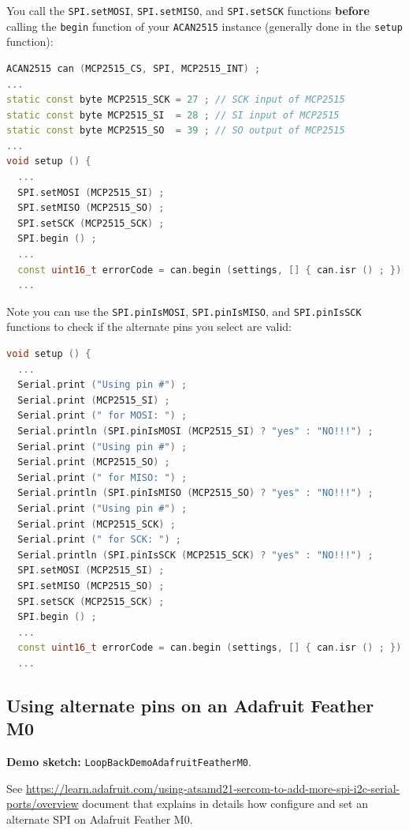 \documentclass[10pt, a4paper, obeyspaces]{extarticle}
\newcommand \subsectionLabel[2]{\subsection{#1}\label{subsec:#2}}
\begin{document}
You call the \texttt{SPI.setMOSI}, \texttt{SPI.setMISO}, and \texttt{SPI.setSCK} functions \textbf{before} calling the \texttt{begin} function of your \texttt{ACAN2515} instance (generally done in the \texttt{setup} function):
{ \small\begin{lstlisting}[language=c++]
ACAN2515 can (MCP2515_CS, SPI, MCP2515_INT) ;
...
static const byte MCP2515_SCK = 27 ; // SCK input of MCP2515 
static const byte MCP2515_SI  = 28 ; // SI input of MCP2515  
static const byte MCP2515_SO  = 39 ; // SO output of MCP2515 
...
void setup () {
  ...
  SPI.setMOSI (MCP2515_SI) ;
  SPI.setMISO (MCP2515_SO) ;
  SPI.setSCK (MCP2515_SCK) ;
  SPI.begin () ;
  ...
  const uint16_t errorCode = can.begin (settings, [] { can.isr () ; }) ;
  ...
\end{lstlisting}}

Note you can use the \texttt{SPI.pinIsMOSI}, \texttt{SPI.pinIsMISO}, and \texttt{SPI.pinIsSCK} functions to check if the alternate pins you select are valid:
{ \small\begin{lstlisting}[language=c++]
void setup () {
  ...
  Serial.print ("Using pin #") ;
  Serial.print (MCP2515_SI) ;
  Serial.print (" for MOSI: ") ;
  Serial.println (SPI.pinIsMOSI (MCP2515_SI) ? "yes" : "NO!!!") ;
  Serial.print ("Using pin #") ;
  Serial.print (MCP2515_SO) ;
  Serial.print (" for MISO: ") ;
  Serial.println (SPI.pinIsMISO (MCP2515_SO) ? "yes" : "NO!!!") ;
  Serial.print ("Using pin #") ;
  Serial.print (MCP2515_SCK) ;
  Serial.print (" for SCK: ") ;
  Serial.println (SPI.pinIsSCK (MCP2515_SCK) ? "yes" : "NO!!!") ;
  SPI.setMOSI (MCP2515_SI) ;
  SPI.setMISO (MCP2515_SO) ;
  SPI.setSCK (MCP2515_SCK) ;
  SPI.begin () ;
  ...
  const uint16_t errorCode = can.begin (settings, [] { can.isr () ; }) ;
  ...
\end{lstlisting}}




\subsectionLabel{Using alternate pins on an Adafruit Feather M0}{AdafruitFeatherM0AlternatePins}

{\bf Demo sketch: } \texttt{LoopBackDemoAdafruitFeatherM0}.

See \url{https://learn.adafruit.com/using-atsamd21-sercom-to-add-more-spi-i2c-serial-ports/overview} document that explains in details how configure and set an alternate SPI on Adafruit Feather M0.
\end{document}
